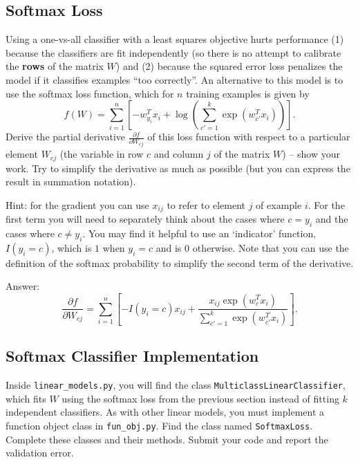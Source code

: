 \documentclass{article}
\def\ans#1{\par\gre{Answer: #1}}
\def\blu#1{{\color{blu}#1}}
\def\gre#1{{\color{gre}#1}}
\let\ask\blu
\begin{document}
\pagebreak

\subsection{Softmax Loss}

Using a one-vs-all classifier with a least squares objective hurts performance (1) because the classifiers are fit independently (so there is no attempt to calibrate the \textbf{rows} of the matrix $W$) and (2) because the squared error loss penalizes the model if it classifies examples ``too correctly''. An alternative to this model is to use the softmax loss function, which for $n$ training examples is given by
\[
f(W) = \sum_{i=1}^n \left[-w_{y_i}^Tx_i + \log\left(\sum_{c' = 1}^k \exp(w_{c'}^Tx_i)\right)\right].
\]
\blu{Derive the partial derivative $\frac{\partial f}{\partial W_{cj}}$ of this loss function with respect to a particular element $W_{cj}$ (the variable in row $c$ and column $j$ of the matrix $W$) -- show your work}. Try to simplify the derivative as much as possible (but you can express the result in summation notation).

Hint: for the gradient you can use $x_{ij}$ to refer to element $j$ of example $i$. For the first term you will need to separately think about the cases where $c=y_i$ and the cases where $c\neq y_i$. You may find it helpful to use an `indicator' function, $I(y_i = c)$, which is $1$ when $y_i = c$ and is $0$ otherwise. Note that you can use the definition of the softmax probability to simplify the second term of the derivative.

\ans{
\[
\frac{\partial f}{\partial W_{cj}}=
    \sum_{i=1}^n \left[-I(y_i = c)x_{ij} + \frac{x_{ij}\exp(w_c^Tx_i)}{\sum_{c' = 1}^k \exp(w_{c'}^Tx_i)}\right ].
\]
}


\pagebreak

\subsection{Softmax Classifier Implementation }

Inside \verb|linear_models.py|, you will find the class \verb|MulticlassLinearClassifier|, which fits $W$ using the softmax loss from the previous section instead of fitting $k$ independent classifiers. As with other linear models, you must implement a function object class in \verb|fun_obj.py|. Find the class named \verb|SoftmaxLoss|. Complete these classes and their methods. \ask{Submit your code and report the validation error.}
\end{document}
